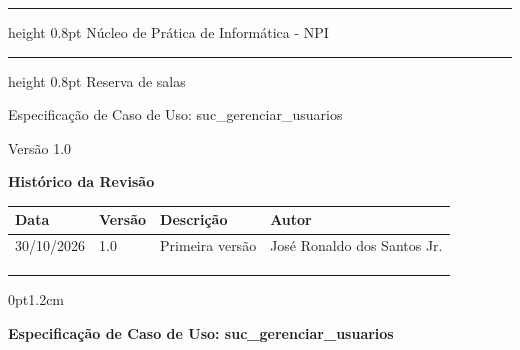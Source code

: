 \documentclass[12pt,letterpaper]{article}
\newcommand{\ucnome}{suc\_\allowbreak gerenciar\_\allowbreak usuarios}
\newcommand{\ucprojeto}{Reserva de salas}
\newcommand{\ucversao}{1.0}
\newcommand{\ucdata}{30/10/2026}
\newcommand{\ucautor}{José Ronaldo dos Santos Jr.}
\newcommand{\ucorgao}{Núcleo de Prática de Informática - NPI}
\newcommand{\uctitulo}{Especificação de Caso de Uso: \ucnome}
\begin{document}

\thispagestyle{empty}
\vspace*{-2.2cm}
{\sffamily\bfseries
  \hrule height 0.8pt
  \vspace{10pt}
  \raggedleft \Large \ucorgao \par
  \vspace{10pt}
  \hrule height 0.8pt
  \vspace{30pt}
  \raggedleft \Large \ucprojeto \par
  \vspace{10pt}
  \raggedleft \Large \uctitulo \par
  \vspace{34pt}
  \raggedleft \large Versão \ucversao \par
}
\newpage


\begin{center}
  {\sffamily\LARGE\bfseries Histórico da Revisão}
\end{center}

\vspace{6pt}

\hspace*{-\tabcolsep}%
\begin{tabular}{|p{}|p{}|p{}|p{}|}
  \hline
  \centering\textbf{Data} & \centering\textbf{Versão} & \centering\textbf{Descrição}
    & \centering\arraybackslash\textbf{Autor} \\
  \hline
  \ucdata & \ucversao & Primeira versão & \ucautor \\
  \hline
  & & & \\
  \hline
  & & & \\
  \hline
  & & & \\
  \hline
\end{tabular}

\vspace{18pt}

\begin{adjustwidth}{0pt}{1.2cm}
  \tableofcontents
\end{adjustwidth}
\thispagestyle{fancy}
\newpage


\begin{center}
  {\sffamily\Large\bfseries \uctitulo}
\end{center}
\end{document}
